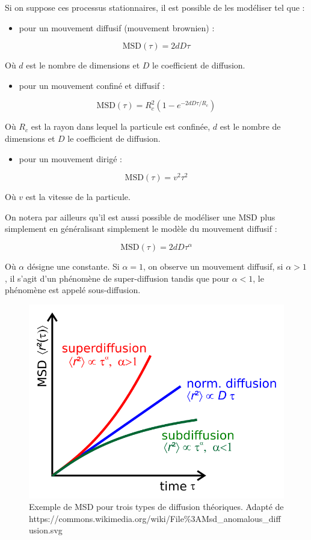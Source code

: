\documentclass[12pt,a4paper,twoside,openright]{book}
\providecommand{\tightlist}{%
  \setlength{\itemsep}{0pt}\setlength{\parskip}{0pt}}
\begin{document}
Si on suppose ces processus stationnaires, il est possible de les
modéliser tel que :

\begin{itemize}
\tightlist
\item
  pour un mouvement diffusif (mouvement brownien) :
\end{itemize}

\[
\mbox{MSD}(\tau) = 2dD\tau
\]

Où \(d\) est le nombre de dimensions et \(D\) le coefficient de
diffusion.

\begin{itemize}
\tightlist
\item
  pour un mouvement confiné et diffusif :
\end{itemize}

\[
\mbox{MSD}(\tau) = R_c^2(1-e^{-2dD\tau / R_c})
\]

Où \(R_c\) est la rayon dans lequel la particule est confinée, \(d\) est
le nombre de dimensions et \(D\) le coefficient de diffusion.

\begin{itemize}
\tightlist
\item
  pour un mouvement dirigé :
\end{itemize}

\[
\mbox{MSD}(\tau) = v^2\tau ^2
\]

Où \(v\) est la vitesse de la particule.

On notera par ailleurs qu'il est aussi possible de modéliser une MSD
plus simplement en généralisant simplement le modèle du mouvement
diffusif :

\[
\mbox{MSD}(\tau) = 2dD\tau ^ {\alpha}
\]

Où \(\alpha\) désigne une constante. Si \(\alpha = 1\), on observe un
mouvement diffusif, si \(\alpha > 1\), il s'agit d'un phénomène de
super-diffusion tandis que pour \(\alpha < 1\), le phénomène est appelé
sous-diffusion.

\begin{figure}[htbp]
\centering
\includegraphics{figures/results/imaging/wiki_diffuse.png}
\caption{\label{fig:wiki_diffuse}Exemple de MSD pour trois types de
diffusion théoriques. Adapté de
https://commons.wikimedia.org/wiki/File\%3AMsd\_anomalous\_diffusion.svg}
\end{figure}
\end{document}
